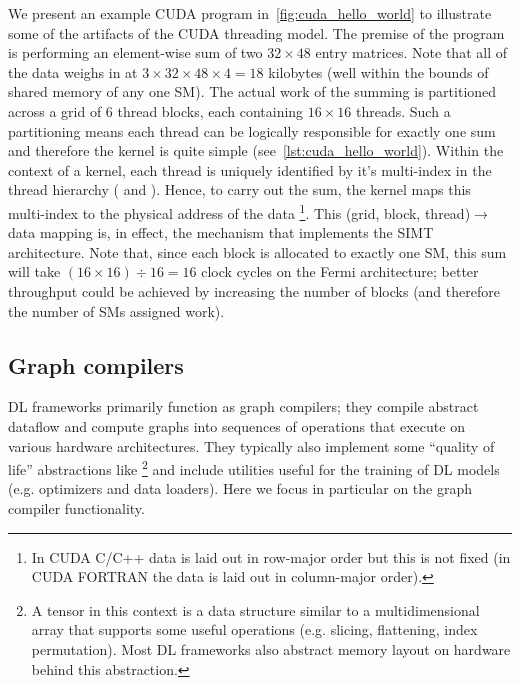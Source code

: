 We present an example CUDA program in~\cref{fig:cuda_hello_world} to illustrate some of the artifacts of the CUDA threading model.
The premise of the program is performing an element-wise sum of two $32 \times 48$ entry matrices.
Note that all of the data weighs in at  $3 \times 32 \times 48 \times 4 = 18$ kilobytes (well within the bounds of shared memory of any one SM).
The actual work of the summing is partitioned across a grid of 6 thread blocks, each containing $16 \times 16$ threads.
Such a partitioning means each thread can be logically responsible for exactly one sum and therefore the kernel is quite simple (see~\cref{lst:cuda_hello_world}).
Within the context of a kernel, each thread is uniquely identified by it's multi-index in the thread hierarchy ( and ).
Hence, to carry out the sum, the kernel maps this multi-index to the physical address of the data%
\footnote{In CUDA C/C++ data is laid out in row-major order but this is not fixed (in CUDA FORTRAN the data is laid out in column-major order).}.
This (grid, block, thread)$\rightarrow$data mapping is, in effect, the mechanism that implements the SIMT architecture.
Note that, since each block is allocated to exactly one SM, this sum will take $\left( 16 \times 16 \right) \div 16 = 16$ clock cycles on the Fermi architecture;
better throughput could be achieved by increasing the number of blocks (and therefore the number of SMs assigned work).



\subsection{Graph compilers}\label{subsec:graph-compilers}

DL frameworks primarily function as graph compilers;
they compile abstract dataflow and compute graphs into sequences of operations that execute on various hardware architectures.
They typically also implement some ``quality of life'' abstractions like %
\footnote{A tensor in this context is a data structure similar to a multidimensional array that supports some useful operations (e.g. slicing, flattening, index permutation). Most DL frameworks also abstract memory layout on hardware behind this abstraction.} and include utilities useful for the training of DL models (e.g. optimizers and data loaders).
Here we focus in particular on the graph compiler functionality.

